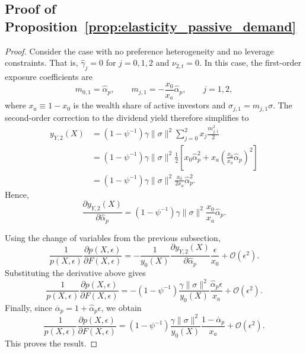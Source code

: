 \subsection{Proof of Proposition~\ref{prop:elasticity_passive_demand}}\label{app:prop_elasticity_passive_demand}
\begin{proof}
Consider the case with no preference heterogeneity and no leverage constraints.
That is, $\hat{\gamma}_j=0$ for $j=0,1,2$ and $\nu_{2,t}=0$.
In this case, the first-order exposure coefficients are
\begin{equation}
    m_{0,1}=\hat{\alpha}_p, \qquad
    m_{j,1}=-\frac{x_0}{x_a}\hat{\alpha}_p, \qquad j=1,2,
\end{equation}
where $x_a\equiv 1-x_0$ is the wealth share of active investors and $\sigma_{j,1}=m_{j,1}\sigma$.
The second-order correction to the dividend yield therefore simplifies to
\begin{align}
    y_{Y,2}(X)
    &= (1-\psi^{-1})\gamma\|\sigma\|^2
    \sum_{j=0}^2 x_j \frac{m_{j,1}^2}{2} \nonumber\\
    &= (1-\psi^{-1})\gamma\|\sigma\|^2
    \frac{1}{2}\left[x_0\hat{\alpha}_p^2+x_a\left(\frac{x_0}{x_a}\hat{\alpha}_p\right)^2\right] \nonumber\\
    &= (1-\psi^{-1})\gamma\|\sigma\|^2
    \frac{x_0}{2x_a}\hat{\alpha}_p^2.
\end{align}
Hence,
\begin{equation}
    \frac{\partial y_{Y,2}(X)}{\partial \hat{\alpha}_p}
    = (1-\psi^{-1})\gamma\|\sigma\|^2
    \frac{x_0}{x_a}\hat{\alpha}_p.
\end{equation}

Using the change of variables from the previous subsection,
\begin{equation}
    \frac{1}{p(X,\epsilon)}\frac{\partial p(X,\epsilon)}{\partial F(X,\epsilon)}
    = -\frac{1}{y_0(X)}
    \frac{\partial y_{Y,2}(X)}{\partial \hat{\alpha}_p}
    \frac{\epsilon}{x_0}
    +\mathcal{O}(\epsilon^2).
\end{equation}
Substituting the derivative above gives
\begin{equation}
    \frac{1}{p(X,\epsilon)}\frac{\partial p(X,\epsilon)}{\partial F(X,\epsilon)}
    = -(1-\psi^{-1})\frac{\gamma\|\sigma\|^2}{y_0(X)}
    \frac{\hat{\alpha}_p\epsilon}{x_a}
    +\mathcal{O}(\epsilon^2).
\end{equation}
Finally, since $\overline{\alpha}_p=1+\hat{\alpha}_p\epsilon$, we obtain
\begin{equation}
    \frac{1}{p(X,\epsilon)}\frac{\partial p(X,\epsilon)}{\partial F(X,\epsilon)}
    = (1-\psi^{-1})\frac{\gamma\|\sigma\|^2}{y_0(X)}
    \frac{1-\overline{\alpha}_p}{x_a}
    +\mathcal{O}(\epsilon^2).
\end{equation}
This proves the result.
\end{proof}


